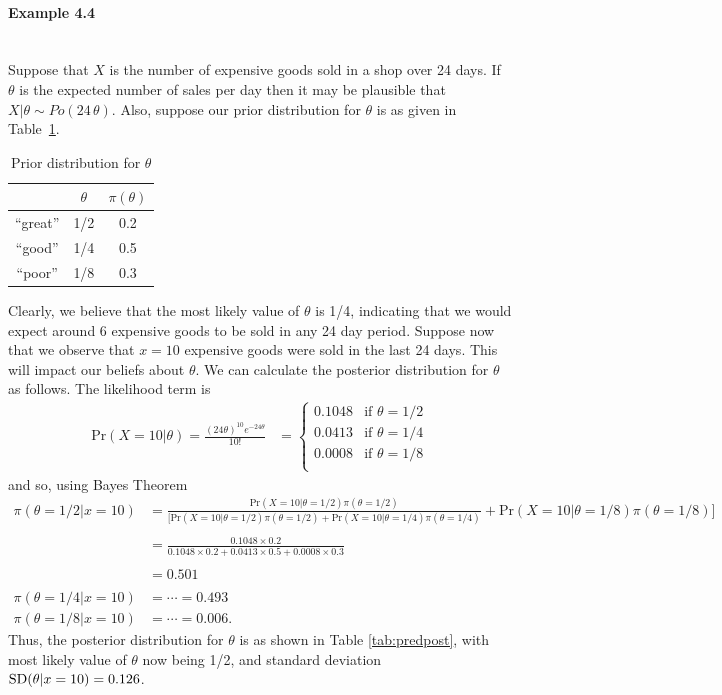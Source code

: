 \paragraph{Example 4.4}{~\\
Suppose that $X$ is the number of expensive goods sold in a shop over 24 days. If $\theta$ is the expected number of sales per day then it may be plausible that $X|\theta\sim Po(24\,\theta)$. Also, suppose our prior distribution for $\theta$ is as given in Table~\ref{tab:predprior}.

\begin{table}[ht]
\bigskip

\begin{tabular}{|c|c|c|}
\cline{2-3}
\multicolumn{1}{c|}{~}& $\theta$ & $\pi(\theta)$ \\
\hline
``great'' & 1/2 & 0.2 \\
``good'' & 1/4 & 0.5 \\
``poor'' & 1/8 & 0.3 \\
\hline
\end{tabular}
\caption{Prior distribution for $\theta$}
\label{tab:predprior}

\end{table}

Clearly, we believe that the most likely value of $\theta$ is 1/4, indicating that we would expect around 6 expensive goods to be sold in any 24 day period. Suppose now that we observe that $x=10$ expensive goods were sold in the last 24 days. This will impact our beliefs about $\theta$. We can calculate the posterior distribution for
$\theta$ as follows. The likelihood term is
\begin{align*}
\text{Pr}(X=10|\theta)
=\frac{(24\theta)^{10} e^{-24\theta}}{10!} 
&=\begin{cases} 0.1048 & \text{if }\theta=1/2 \\
                 0.0413 & \text{if }\theta=1/4 \\
                 0.0008 & \text{if }\theta=1/8\\
   \end{cases}
\end{align*}
and so, using Bayes Theorem
\begin{align*}
\pi(\theta=1/2|x=10)&=\frac{\text{Pr}(X=10|\theta=1/2)\pi(\theta=1/2)}
{[\text{Pr}(X=10|\theta=1/2)\pi(\theta=1/2)+\text{Pr}(X=10|\theta=1/4)\pi(\theta=1/4)} +\text{Pr}(X=10|\theta=1/8)\pi(\theta=1/8)] \\
& \\
&=\frac{0.1048\times 0.2}{0.1048\times 0.2+0.0413\times
0.5+0.0008\times 0.3} \\ \\
&=0.501 \\ \\
\pi(\theta=1/4|x=10)&=\cdots=0.493 \\
\pi(\theta=1/8|x=10)&=\cdots=0.006.
\end{align*}
Thus, the posterior distribution for $\theta$ is as shown in Table \ref{tab:predpost}, with most likely value of $\theta$ now being 1/2, and standard deviation $\textnormal{SD}(\theta|x=10)=0.126$.
\begin{table}[ht]
\bigskip


\end{table}}

